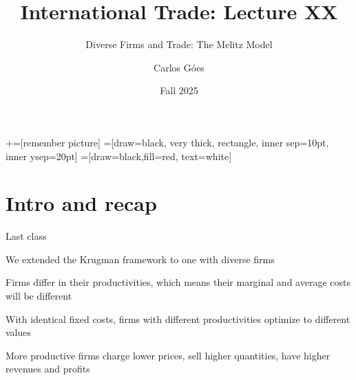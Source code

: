 \documentclass[notes,11pt, aspectratio=169, xcolor=table]{beamer}
\title[]{International Trade: Lecture XX}
\subtitle[]{Diverse Firms and Trade: The Melitz Model}
\author[Góes]
{Carlos Góes\inst{1}}
\date{Fall 2025}
\institute[GWU]{\inst{1} George Washington University }
\newenvironment{wideitemize}{\itemize\addtolength{\itemsep}{10pt}}{\enditemize}
\begin{document}
\newcommand\marktopleft[1]{%
    \tikz[overlay,remember picture] 
        \node (marker-#1-a) at (-.3em,.3em) {};%
}
\newcommand\markbottomright[2]{%
    \tikz[overlay,remember picture] 
        \node (marker-#1-b) at (0em,0em) {};%
}
+=[remember picture] 
 =[draw=black, very thick, rectangle, inner sep=10pt, inner ysep=20pt]
 =[draw=black,fill=red, text=white]















\frame{\titlepage}
\addtocounter{framenumber}{-1}

\section{Intro and recap}

\begin{frame}{Last class}

    \begin{wideitemize}
        \item We extended the Krugman framework to one with diverse firms
        \item Firms differ in their productivities, which means their marginal and average costs will be different
        \item With identical fixed costs, firms with different productivities optimize to different values
        \item More productive firms charge lower prices, sell higher quantities, have higher revenues and profits
    \end{wideitemize}
    
\end{frame}
\end{document}
